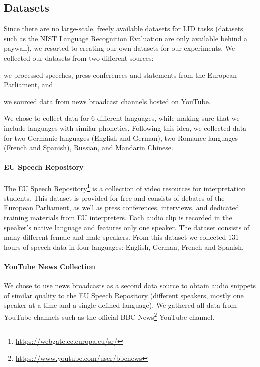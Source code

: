 \documentclass{llncs}
\begin{document}
\subsection{Datasets}

Since there are no large-scale, freely available datasets for \ac{LID} tasks (datasets such as the NIST Language Recognition Evaluation are only available behind a paywall), we resorted to creating our own datasets for our experiments.
We collected our datasets from two different sources:
\begin{enumerate*}[label={(\arabic*)}]
	\item we processed speeches, press conferences and statements from the European Parliament, and
	\item we sourced data from news broadcast channels hosted on YouTube.
\end{enumerate*}
We chose to collect data for 6 different languages, while making sure that we include languages with similar phonetics.
Following this idea, we collected data for two Germanic languages (English and German), two Romance languages (French and Spanish), Russian, and Mandarin Chinese.

\paragraph{EU Speech Repository}

The EU Speech Repository\footnote{\url{https://webgate.ec.europa.eu/sr/}} is a collection of video resources for interpretation students.
This dataset is provided for free and consists of debates of the European Parliament, as well as press conferences, interviews, and dedicated training materials from EU interpreters.
Each audio clip is recorded in the speaker's native language and features only one speaker.
The dataset consists of many different female and male speakers.
From this dataset we collected 131 hours of speech data in four languages: English, German, French and Spanish.

\paragraph{YouTube News Collection}

We chose to use news broadcasts as a second data source to obtain audio snippets of similar quality to the EU Speech Repository (different speakers, mostly one speaker at a time and a single defined language).
We gathered all data from YouTube channels such as the official BBC News\footnote{\url{https://www.youtube.com/user/bbcnews}} YouTube channel.
\end{document}

